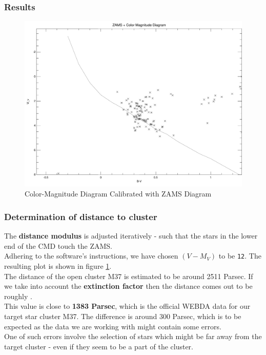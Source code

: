 \documentclass[12pt,a4paper]{article}
\begin{document}
\subsubsection{Results}
\label{sec:results_photometry}
\begin{figure}[H]
  \centering
  \includegraphics[width=1.0\textwidth]{Pictures/CMD_M37_2.pdf}
  \caption{Color-Magnitude Diagram Calibrated with ZAMS Diagram}
  \label{fig:CMD_ZAMS}
\end{figure}

\subsubsection*{Determination of distance to cluster}
The \textbf{distance modulus} is adjusted iteratively - such that the stars in the lower end of the CMD touch the ZAMS. 
\\ Adhering to the software's instructions, we have chosen $(V - M_V)$ to be \texttt{12}. The resulting plot is shown in figure \ref{fig:CMD_ZAMS}.
\\ The distance of the open cluster M37 is estimated to be around 2511 Parsec. If we take into account the \textbf{extinction factor} then the distance comes out to be roughly .
\\ This value is close to \textbf{ 1383 Parsec}, which is the official WEBDA data for our target star cluster M37. The difference is around 300 Parsec, which is to be expected as the data we are working with might contain some errors. 
\\ One of such errors involve the selection of stars which might be far away from the target cluster - even if they seem to be a part of the cluster.
\end{document}
